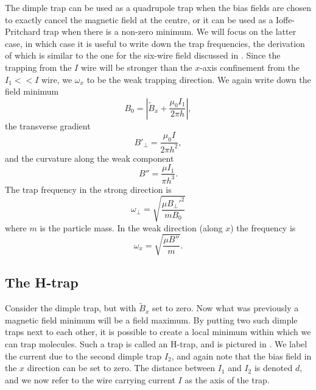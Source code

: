 The dimple trap can be used as a quadrupole trap when the bias fields are
chosen to exactly cancel the magnetic field at the centre, or it can be used as
a Ioffe-Pritchard trap when there is a non-zero minimum. We will focus on the
latter case, in which case it is useful to write down the trap frequencies, the
derivation of which is similar to the one for the six-wire field discussed in
.
Since the trapping from the $I$ wire will be stronger than the $x$-axis
confinement from the $I_1 << I$ wire, we $\omega_x$ to be the weak trapping
direction. We again write down the field minimum
%
\begin{equation}
  B_0 = \left|\tilde{B}_x + \frac{\mu_0 I_1}{2\pi h}\right|,
\end{equation}
%
the transverse gradient
%
\begin{equation}
  B'_\perp = \frac{\mu_0 I}{2 \pi h^2},
\end{equation}
%
and the curvature along the weak component
%
\begin{equation}
  B'' = \frac{\mu I_1}{\pi h^3}.
\end{equation}
%
The trap frequency in the strong direction is~\cite{2011Ac}
%
\begin{equation}
  \omega_\perp = \sqrt{\frac{\mu B_\perp'^2}{m B_0}}
  \label{theory:eqn:perpfreq}
\end{equation}
%
where $m$ is the particle mass. In the weak direction (along $x$) the frequency
is~\cite{2011Ac}
%
\begin{equation}
  \omega_x = \sqrt{\frac{\mu B''}{m}}.
  \label{theory:eqn:xfreq}
\end{equation}

\subsection{The H-trap}

Consider the dimple trap, but with $\tilde{B}_x$ set to zero. Now what was
previously a magnetic field minimum will be a field maximum. By putting two
such dimple traps next to each other, it is possible to create a local minimum
within which we can trap molecules. Such a trap is called an H-trap, and is
pictured in . We label the current due to the second
dimple trap $I_2$, and again note that the bias field in the $x$ direction can
be set to zero. The distance between $I_1$ and $I_2$ is denoted $d$, and we now
refer to the wire carrying current $I$ as the axis of the trap.

